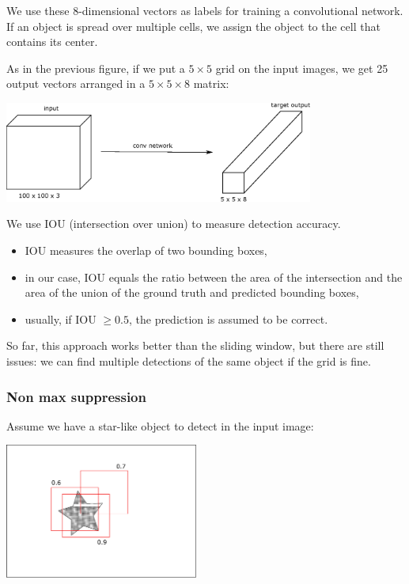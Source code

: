 \documentclass[a4paper,11pt]{report}
\begin{document}
We use these 8-dimensional vectors as labels for training a convolutional network. If an object is spread over multiple cells, we assign the object to the cell that contains its center.

As in the previous figure, if we put a $5\times 5$ grid on the input images, we get 25 output vectors arranged in a $5\times 5 \times 8$ matrix:

\begin{center}
\includegraphics[width = 4in]{convolutions/yolo_target}
\end{center}

We use IOU (intersection over union) to measure detection accuracy.
\begin{itemize}
  \item IOU measures the overlap of two bounding boxes,
  \item in our case, IOU equals the ratio between the area of the intersection and the area of the union of the ground truth and predicted bounding boxes,
  \item usually, if IOU $\ge 0.5$, the prediction is assumed to be correct.
\end{itemize}

So far, this approach works better than the sliding window, but there are still issues: we can find multiple detections of the same object if the grid is fine.

\subsubsection*{Non max suppression}

Assume we have a star-like object to detect in the input image:

\begin{center}
\includegraphics[width = 2.5in]{convolutions/yolo_nonmax}
\end{center}
\end{document}
